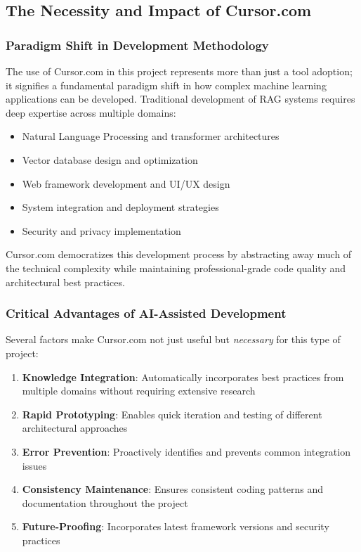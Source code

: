 \documentclass[12pt,letterpaper]{article}
\begin{document}
\subsection{The Necessity and Impact of Cursor.com}

\subsubsection{Paradigm Shift in Development Methodology}

The use of Cursor.com in this project represents more than just a tool adoption; it signifies a fundamental paradigm shift in how complex machine learning applications can be developed. Traditional development of RAG systems requires deep expertise across multiple domains:

\begin{itemize}
    \item Natural Language Processing and transformer architectures
    \item Vector database design and optimization
    \item Web framework development and UI/UX design
    \item System integration and deployment strategies
    \item Security and privacy implementation
\end{itemize}

Cursor.com democratizes this development process by abstracting away much of the technical complexity while maintaining professional-grade code quality and architectural best practices.

\subsubsection{Critical Advantages of AI-Assisted Development}

Several factors make Cursor.com not just useful but \textit{necessary} for this type of project:

\begin{enumerate}
    \item \textbf{Knowledge Integration}: Automatically incorporates best practices from multiple domains without requiring extensive research
    \item \textbf{Rapid Prototyping}: Enables quick iteration and testing of different architectural approaches
    \item \textbf{Error Prevention}: Proactively identifies and prevents common integration issues
    \item \textbf{Consistency Maintenance}: Ensures consistent coding patterns and documentation throughout the project
    \item \textbf{Future-Proofing}: Incorporates latest framework versions and security practices
\end{enumerate}
\end{document}
